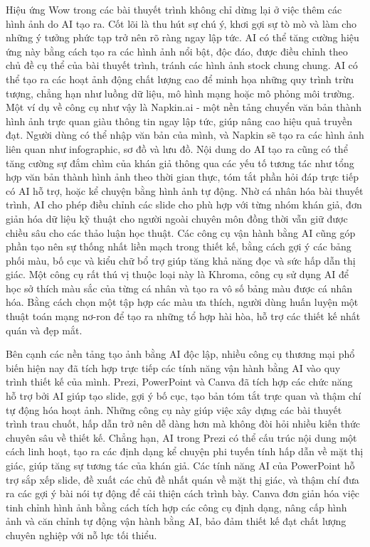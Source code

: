 Hiệu ứng Wow trong các bài thuyết trình không chỉ dừng lại ở việc thêm các hình ảnh do AI tạo ra. Cốt lõi là thu hút sự chú ý, khơi gợi sự tò mò và làm cho những ý tưởng phức tạp trở nên rõ ràng ngay lập tức. AI có thể tăng cường hiệu ứng này bằng cách tạo ra các hình ảnh nổi bật, độc đáo, được điều chỉnh theo chủ đề cụ thể của bài thuyết trình, tránh các hình ảnh stock chung chung. AI có thể tạo ra các hoạt ảnh động chất lượng cao để minh họa những quy trình trừu tượng, chẳng hạn như luồng dữ liệu, mô hình mạng hoặc mô phỏng môi trường. Một ví dụ về công cụ như vậy là Napkin.ai - một nền tảng chuyển văn bản thành hình ảnh trực quan giàu thông tin ngay lập tức, giúp nâng cao hiệu quả truyền đạt. Người dùng có thể nhập văn bản của mình, và Napkin sẽ tạo ra các hình ảnh liên quan như infographic, sơ đồ và lưu đồ. Nội dung do AI tạo ra cũng có thể tăng cường sự đắm chìm của khán giả thông qua các yếu tố tương tác như tổng hợp văn bản thành hình ảnh theo thời gian thực, tóm tắt phần hỏi đáp trực tiếp có AI hỗ trợ, hoặc kể chuyện bằng hình ảnh tự động. Nhờ cá nhân hóa bài thuyết trình, AI cho phép điều chỉnh các slide cho phù hợp với từng nhóm khán giả, đơn giản hóa dữ liệu kỹ thuật cho người ngoài chuyên môn đồng thời vẫn giữ được chiều sâu cho các thảo luận học thuật. Các công cụ vận hành bằng AI cũng góp phần tạo nên sự thống nhất liền mạch trong thiết kế, bằng cách gợi ý các bảng phối màu, bố cục và kiểu chữ bổ trợ giúp tăng khả năng đọc và sức hấp dẫn thị giác. Một công cụ rất thú vị thuộc loại này là Khroma, công cụ sử dụng AI để học sở thích màu sắc của từng cá nhân và tạo ra vô số bảng màu được cá nhân hóa. Bằng cách chọn một tập hợp các màu ưa thích, người dùng huấn luyện một thuật toán mạng nơ-ron để tạo ra những tổ hợp hài hòa, hỗ trợ các thiết kế nhất quán và đẹp mắt.

Bên cạnh các nền tảng tạo ảnh bằng AI độc lập, nhiều công cụ thương mại phổ biến hiện nay đã tích hợp trực tiếp các tính năng vận hành bằng AI vào quy trình thiết kế của mình. Prezi, PowerPoint và Canva đã tích hợp các chức năng hỗ trợ bởi AI giúp tạo slide, gợi ý bố cục, tạo bản tóm tắt trực quan và thậm chí tự động hóa hoạt ảnh. Những công cụ này giúp việc xây dựng các bài thuyết trình trau chuốt, hấp dẫn trở nên dễ dàng hơn mà không đòi hỏi nhiều kiến thức chuyên sâu về thiết kế. Chẳng hạn, AI trong Prezi có thể cấu trúc nội dung một cách linh hoạt, tạo ra các định dạng kể chuyện phi tuyến tính hấp dẫn về mặt thị giác, giúp tăng sự tương tác của khán giả. Các tính năng AI của PowerPoint hỗ trợ sắp xếp slide, đề xuất các chủ đề nhất quán về mặt thị giác, và thậm chí đưa ra các gợi ý bài nói tự động để cải thiện cách trình bày. Canva đơn giản hóa việc tinh chỉnh hình ảnh bằng cách tích hợp các công cụ định dạng, nâng cấp hình ảnh và căn chỉnh tự động vận hành bằng AI, bảo đảm thiết kế đạt chất lượng chuyên nghiệp với nỗ lực tối thiểu.

